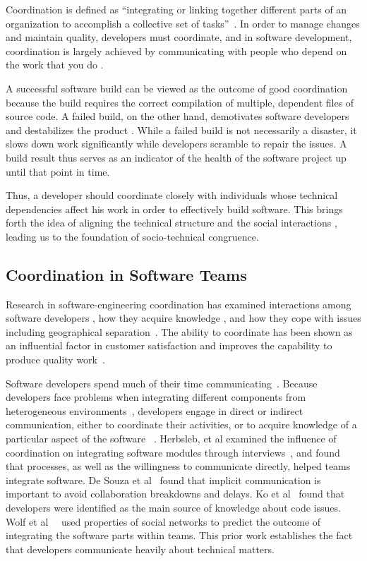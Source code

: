 Coordination is defined as ``integrating or linking together different parts of an organization to accomplish a collective set of tasks''~\cite{vandeven1976}. In order to manage changes and maintain quality, developers must coordinate, and in software development, coordination is largely achieved by communicating with people who depend on the work that you do \cite{kraut:1995coordination}.

A successful software build can be viewed as the outcome of good coordination because the build requires the correct compilation of multiple, dependent files of source code.
A failed build, on the other hand, demotivates software developers \cite{holck2004,damian:icgse:2007} and destabilizes the product \cite{cusumano1997}.
While a failed build is not necessarily a disaster, it slows down work significantly while developers scramble to repair the issues.
A build result thus serves as an indicator of the health of the software project up until that point in time.

Thus, a developer should coordinate closely with individuals whose technical dependencies affect his work in order to effectively build software. This brings forth the idea of aligning the technical structure and the social interactions \cite{herbsleb2007:fose}, leading us to the foundation of socio-technical congruence.

\subsection{Coordination in Software Teams}
Research in software-engineering coordination has examined interactions among
software developers \cite{carter2004,marczak:re:2008}, how they acquire
knowledge \cite{ehrlich:icgse:2006,nakakoji2010:rdc}, and
how they cope with issues including geographical
separation~\cite{espinosa2007:team_knowledge,herbsleb2003:speed}.
The ability to coordinate has
been shown as an influential factor in customer satisfaction \cite{kraut:1995coordination} and  improves the capability to produce quality work~\cite{faraj2000}.


Software developers spend much of their time
communicating~\cite{perry94}. Because developers face
problems when integrating different components from heterogeneous environments~\cite{redmiles2007:continuous},
developers engage in direct or indirect
communication, either to coordinate their activities, or to acquire knowledge of
a particular aspect of the software ~\cite{nakakoji2010:rdc}.
Herbsleb, et al examined the influence of coordination on integrating software
modules through interviews~\cite{herbsleb1999:architectures}, and found that
processes, as well as the willingness to communicate directly, helped teams
integrate software. De Souza et al~\cite{desouza2007:awarenessnetwork} found that implicit
communication is important to avoid collaboration breakdowns and delays. Ko et al~\cite{ko:icse:2007} found that developers were identified as the main source of knowledge about code issues.
Wolf et al~~\cite{wolf:icse:2009} used properties of social networks to predict the outcome of integrating the software parts within teams.
This prior work establishes the fact that developers communicate heavily about technical matters.

